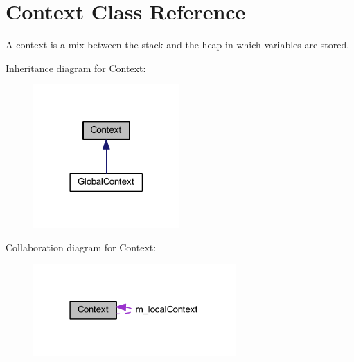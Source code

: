 \hypertarget{class_context}{\section{Context Class Reference}
\label{class_context}
}


A context is a mix between the stack and the heap in which variables are stored.  




Inheritance diagram for Context\-:\nopagebreak
\begin{figure}[H]
\begin{center}
\leavevmode
\includegraphics[width=158pt]{class_context__inherit__graph}
\end{center}
\end{figure}


Collaboration diagram for Context\-:\nopagebreak
\begin{figure}[H]
\begin{center}
\leavevmode
\includegraphics[width=219pt]{class_context__coll__graph}
\end{center}
\end{figure}
